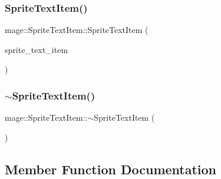 \hypertarget{structmage_1_1_sprite_text_item_a63f6da078daaf11e0412ab242eb233ee}{}\label{structmage_1_1_sprite_text_item_a63f6da078daaf11e0412ab242eb233ee} 
\subsubsection{\texorpdfstring{Sprite\+Text\+Item()}{SpriteTextItem()}\hspace{0.1cm}{\footnotesize\ttfamily [4/4]}}
{\footnotesize\ttfamily mage\+::\+Sprite\+Text\+Item\+::\+Sprite\+Text\+Item (\begin{DoxyParamCaption}\item[{\hyperlink{structmage_1_1_sprite_text_item}{Sprite\+Text\+Item} \&\&}]{sprite\+\_\+text\+\_\+item }\end{DoxyParamCaption})\hspace{0.3cm}{\ttfamily [default]}}

\hypertarget{structmage_1_1_sprite_text_item_a7e130ad6ffd67a6bae97cae676c6bbb0}{}\label{structmage_1_1_sprite_text_item_a7e130ad6ffd67a6bae97cae676c6bbb0} 
\subsubsection{\texorpdfstring{$\sim$\+Sprite\+Text\+Item()}{~SpriteTextItem()}}
{\footnotesize\ttfamily mage\+::\+Sprite\+Text\+Item\+::$\sim$\+Sprite\+Text\+Item (\begin{DoxyParamCaption}{ }\end{DoxyParamCaption})\hspace{0.3cm}{\ttfamily [default]}}



\subsection{Member Function Documentation}
\hypertarget{structmage_1_1_sprite_text_item_a5b98c37b46c928bacb5b82d648c0685e}{}\label{structmage_1_1_sprite_text_item_a5b98c37b46c928bacb5b82d648c0685e} 
